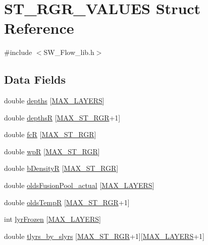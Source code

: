 \hypertarget{struct_s_t___r_g_r___v_a_l_u_e_s}{}\section{S\+T\+\_\+\+R\+G\+R\+\_\+\+V\+A\+L\+U\+ES Struct Reference}
\label{struct_s_t___r_g_r___v_a_l_u_e_s}


{\ttfamily \#include $<$S\+W\+\_\+\+Flow\+\_\+lib.\+h$>$}

\subsection*{Data Fields}
\begin{DoxyCompactItemize}
\item 
double \hyperlink{struct_s_t___r_g_r___v_a_l_u_e_s_a2c59a03dc17326076e48d41f0305d7fb}{depths} \mbox{[}\hyperlink{_s_w___defines_8h_ade9d4b2ac5f29fe89ffea40e7c58c9d6}{M\+A\+X\+\_\+\+L\+A\+Y\+E\+RS}\mbox{]}
\item 
double \hyperlink{struct_s_t___r_g_r___v_a_l_u_e_s_a30a5d46be29a0732e31b9968dce948d3}{depthsR} \mbox{[}\hyperlink{_s_w___defines_8h_a30b7d70368683bce332d0cda6571adec}{M\+A\+X\+\_\+\+S\+T\+\_\+\+R\+GR}+1\mbox{]}
\item 
double \hyperlink{struct_s_t___r_g_r___v_a_l_u_e_s_abf7225426219da03920525e1d122e700}{fcR} \mbox{[}\hyperlink{_s_w___defines_8h_a30b7d70368683bce332d0cda6571adec}{M\+A\+X\+\_\+\+S\+T\+\_\+\+R\+GR}\mbox{]}
\item 
double \hyperlink{struct_s_t___r_g_r___v_a_l_u_e_s_a8373aee16290423cf2592a1a015c5dec}{wpR} \mbox{[}\hyperlink{_s_w___defines_8h_a30b7d70368683bce332d0cda6571adec}{M\+A\+X\+\_\+\+S\+T\+\_\+\+R\+GR}\mbox{]}
\item 
double \hyperlink{struct_s_t___r_g_r___v_a_l_u_e_s_a2e7bb52ccbacd589387f1ff34a24a8e1}{b\+DensityR} \mbox{[}\hyperlink{_s_w___defines_8h_a30b7d70368683bce332d0cda6571adec}{M\+A\+X\+\_\+\+S\+T\+\_\+\+R\+GR}\mbox{]}
\item 
double \hyperlink{struct_s_t___r_g_r___v_a_l_u_e_s_ae22c07ba3dabe9a2020f2a1e47614278}{olds\+Fusion\+Pool\+\_\+actual} \mbox{[}\hyperlink{_s_w___defines_8h_ade9d4b2ac5f29fe89ffea40e7c58c9d6}{M\+A\+X\+\_\+\+L\+A\+Y\+E\+RS}\mbox{]}
\item 
double \hyperlink{struct_s_t___r_g_r___v_a_l_u_e_s_a668387347cc176cdb71e844499ffb8ae}{olds\+TempR} \mbox{[}\hyperlink{_s_w___defines_8h_a30b7d70368683bce332d0cda6571adec}{M\+A\+X\+\_\+\+S\+T\+\_\+\+R\+GR}+1\mbox{]}
\item 
int \hyperlink{struct_s_t___r_g_r___v_a_l_u_e_s_aab2c5010a9480957dd2e5b3c8e0356e2}{lyr\+Frozen} \mbox{[}\hyperlink{_s_w___defines_8h_ade9d4b2ac5f29fe89ffea40e7c58c9d6}{M\+A\+X\+\_\+\+L\+A\+Y\+E\+RS}\mbox{]}
\item 
double \hyperlink{struct_s_t___r_g_r___v_a_l_u_e_s_af5898a5d09563c03d2543060ff265847}{tlyrs\+\_\+by\+\_\+slyrs} \mbox{[}\hyperlink{_s_w___defines_8h_a30b7d70368683bce332d0cda6571adec}{M\+A\+X\+\_\+\+S\+T\+\_\+\+R\+GR}+1\mbox{]}\mbox{[}\hyperlink{_s_w___defines_8h_ade9d4b2ac5f29fe89ffea40e7c58c9d6}{M\+A\+X\+\_\+\+L\+A\+Y\+E\+RS}+1\mbox{]}
\end{DoxyCompactItemize}


